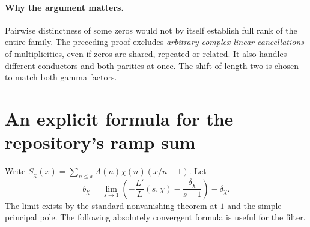 \documentclass[11pt]{article}
\begin{document}
\paragraph{Why the argument matters.} Pairwise distinctness of some zeros would not by itself establish full rank of the entire family. The preceding proof excludes \emph{arbitrary complex linear cancellations} of multiplicities, even if zeros are shared, repeated or related. It also handles different conductors and both parities at once. The shift of length two is chosen to match both gamma factors.

\section{An explicit formula for the repository's ramp sum}
Write $S_\chi(x)=\sum_{n\le x}\Lambda(n)\chi(n)(x/n-1)$. Let
\[
 b_\chi=\lim_{s\to1}\left(-\frac{L'}{L}(s,\chi)-\frac{\delta_\chi}{s-1}\right)-\delta_\chi.
\]
The limit exists by the standard nonvanishing theorem at $1$ and the simple principal pole. The following absolutely convergent formula is useful for the filter.
\end{document}

